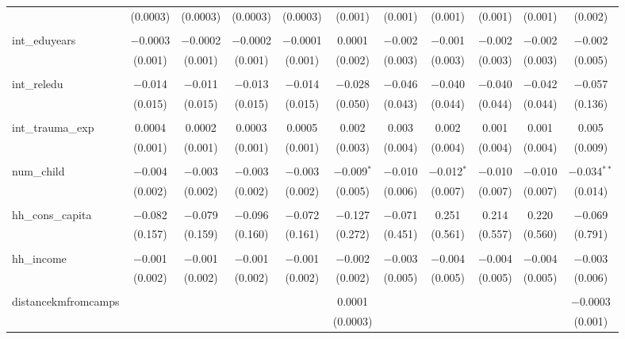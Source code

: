 \begin{table}[H]
\begin{tabular}{@{\extracolsep{4pt}}lcccccccccc}
  & (0.0003) & (0.0003) & (0.0003) & (0.0003) & (0.001) & (0.001) & (0.001) & (0.001) & (0.001) & (0.002) \\ 
  & & & & & & & & & & \\ 
 int\_eduyears & $-$0.0003 & $-$0.0002 & $-$0.0002 & $-$0.0001 & 0.0001 & $-$0.002 & $-$0.001 & $-$0.002 & $-$0.002 & $-$0.002 \\ 
  & (0.001) & (0.001) & (0.001) & (0.001) & (0.002) & (0.003) & (0.003) & (0.003) & (0.003) & (0.005) \\ 
  & & & & & & & & & & \\ 
 int\_reledu & $-$0.014 & $-$0.011 & $-$0.013 & $-$0.014 & $-$0.028 & $-$0.046 & $-$0.040 & $-$0.040 & $-$0.042 & $-$0.057 \\ 
  & (0.015) & (0.015) & (0.015) & (0.015) & (0.050) & (0.043) & (0.044) & (0.044) & (0.044) & (0.136) \\ 
  & & & & & & & & & & \\ 
 int\_trauma\_exp & 0.0004 & 0.0002 & 0.0003 & 0.0005 & 0.002 & 0.003 & 0.002 & 0.001 & 0.001 & 0.005 \\ 
  & (0.001) & (0.001) & (0.001) & (0.001) & (0.003) & (0.004) & (0.004) & (0.004) & (0.004) & (0.009) \\ 
  & & & & & & & & & & \\ 
 num\_child & $-$0.004 & $-$0.003 & $-$0.003 & $-$0.003 & $-$0.009$^{*}$ & $-$0.010 & $-$0.012$^{*}$ & $-$0.010 & $-$0.010 & $-$0.034$^{**}$ \\ 
  & (0.002) & (0.002) & (0.002) & (0.002) & (0.005) & (0.006) & (0.007) & (0.007) & (0.007) & (0.014) \\ 
  & & & & & & & & & & \\ 
 hh\_cons\_capita & $-$0.082 & $-$0.079 & $-$0.096 & $-$0.072 & $-$0.127 & $-$0.071 & 0.251 & 0.214 & 0.220 & $-$0.069 \\ 
  & (0.157) & (0.159) & (0.160) & (0.161) & (0.272) & (0.451) & (0.561) & (0.557) & (0.560) & (0.791) \\ 
  & & & & & & & & & & \\ 
 hh\_income & $-$0.001 & $-$0.001 & $-$0.001 & $-$0.001 & $-$0.002 & $-$0.003 & $-$0.004 & $-$0.004 & $-$0.004 & $-$0.003 \\ 
  & (0.002) & (0.002) & (0.002) & (0.002) & (0.002) & (0.005) & (0.005) & (0.005) & (0.005) & (0.006) \\ 
  & & & & & & & & & & \\ 
 distancekmfromcamps &  &  &  &  & 0.0001 &  &  &  &  & $-$0.0003 \\ 
  &  &  &  &  & (0.0003) &  &  &  &  & (0.001) \\ 

\end{tabular}
\end{table}
